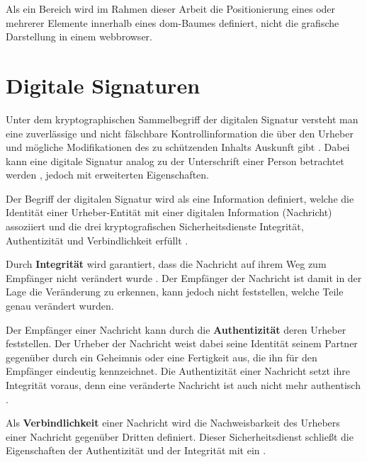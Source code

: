 Als ein Bereich wird im Rahmen dieser Arbeit die Positionierung eines oder mehrerer Elemente innerhalb eines \gls{dom}-Baumes definiert, nicht die grafische
Darstellung in einem \gls{webbrowser}.

\section{Digitale Signaturen}
\label{sec:GrundlagenDefinitionen:DigitaleSignaturen}
Unter dem kryptographischen Sammelbegriff der digitalen Signatur versteht man eine zuverlässige und nicht fälschbare Kontrollinformation die über den Urheber
und mögliche Modifikationen des zu schützenden Inhalts Auskunft gibt \cite{kits}. Dabei kann eine digitale Signatur analog zu der Unterschrift einer Person
betrachtet werden \cite{esig:bsi}, jedoch mit erweiterten Eigenschaften.

Der Begriff der digitalen Signatur wird als eine Information definiert, welche die Identität einer Urheber-Entität mit einer digitalen Information (Nachricht)
assoziiert und die drei kryptografischen Sicherheitsdienste Integrität, Authentizität und Verbindlichkeit erfüllt \cite{hac}.

\label{sec:GrundlagenDefinitionen:DigitaleSignaturen:Integrität}
Durch \textbf{Integrität} wird garantiert, dass die Nachricht auf ihrem Weg zum Empfänger nicht verändert wurde \cite{niag}. Der Empfänger der Nachricht ist
damit in der Lage die Veränderung zu erkennen, kann jedoch nicht feststellen, welche Teile genau verändert wurden.

\label{sec:GrundlagenDefinitionen:DigitaleSignaturen:Authentizität}
Der Empfänger einer Nachricht kann durch die \textbf{Authentizität} deren Urheber feststellen. Der Urheber der Nachricht weist dabei seine Identität seinem
Partner gegenüber durch ein Geheimnis oder eine Fertigkeit aus, die ihn für den Empfänger eindeutig kennzeichnet. Die Authentizität einer Nachricht setzt ihre
Integrität voraus, denn eine veränderte Nachricht ist auch nicht mehr authentisch \cite{kits}.

\label{sec:GrundlagenDefinitionen:DigitaleSignaturen:Verbindlichkeit}
Als \textbf{Verbindlichkeit} einer Nachricht wird die Nachweisbarkeit des Urhebers einer Nachricht gegenüber Dritten definiert. Dieser Sicherheitsdienst schließt die
Eigenschaften der Authentizität und der Integrität mit ein \cite{kits}.

